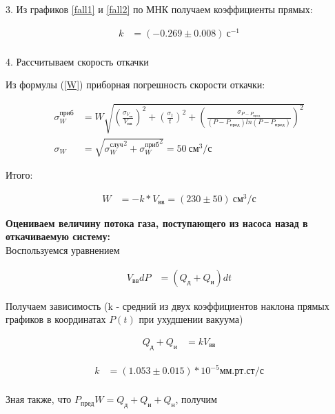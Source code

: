 \documentclass[a4paper, 12pt]{article}
\begin{document}
            3. Из графиков \ref{fall1} и \ref{fall2} по МНК получаем коэффициенты прямых:

            \begin{align*}
                k &= (-0.269 \pm 0.008)~с^{-1}\\
            \end{align*}

            4. Рассчитываем скорость откачки

            Из формулы (\ref{W}) приборная погрешность скорости откачки:

            \begin{align*}
                \sigma_W^{приб} &= W \sqrt{\left( \frac{\sigma_{V_{вв}}}{V_{вв}} \right)^2 + \left( \frac{\sigma_{t}}{t} \right)^2 + \left( \frac{\sigma_{P - P_{пред}}}{(P - P_{пред}) ln(P - P_{пред})} \right)^2}\\
                \sigma_W &= \sqrt{{\sigma_W^{случ}}^2 + {\sigma_W^{приб}}^2} = 50~см^3/с
            \end{align*}

            Итого:

            \begin{align*}
                W &= -k * V_{вв} = (230 \pm 50)~см^3/с
            \end{align*}

        \textbf{Оцениваем величину потока газа, поступающего из насоса назад в откачиваемую систему:} \\

            Воспользуемся уравнением

            \begin{align*}
                V_{вв} dP &= (Q_д + Q_и)dt
            \end{align*}

            Получаем зависимость (k - средний из двух коэффициентов наклона прямых графиков в координатах $P(t)$ при ухудшении вакуума)

            \begin{align*}
                Q_д + Q_и &= k V_{вв}
            \end{align*}

            \begin{align*}
                k &= (1.053 \pm 0.015) * 10^{-5} мм.рт.ст/с\\
            \end{align*}

            Зная также, что $P_{пред}W = Q_д + Q_и + Q_н$, получим
\end{document}
